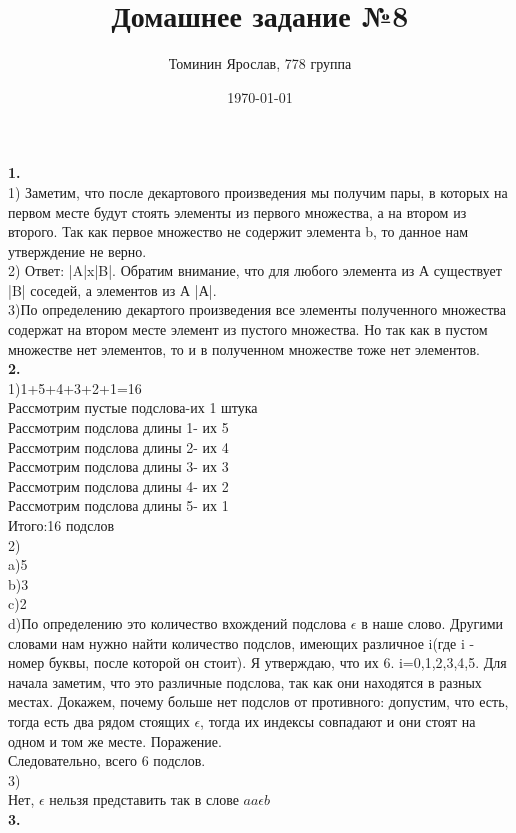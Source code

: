 \documentclass[a4paper,12pt]{article}
\author{Томинин Ярослав, 778 группа}
\title{Домашнее задание №8}
\date{\today}
\begin{document}
 

\maketitle
\newpage
\textbf{1.}\\
1) Заметим, что после декартового произведения мы получим пары, в которых на первом месте будут стоять элементы из первого множества, а на втором из второго. Так как первое множество не содержит элемента b, то данное нам утверждение не верно.\\
2) Ответ: |A|x|B|. Обратим внимание, что для любого элемента из А существует |B| соседей, а элементов из А |А|.\\
3)По определению декартого произведения все элементы полученного множества содержат на втором месте элемент из пустого множества. Но так как в пустом множестве нет элементов, то и в полученном множестве тоже нет элементов.\\
\textbf{2.}\\
1)1+5+4+3+2+1=16\\
Рассмотрим пустые подслова-их 1 штука\\
Рассмотрим подслова длины 1- их 5\\
Рассмотрим подслова длины 2- их 4\\
Рассмотрим подслова длины 3- их 3\\
Рассмотрим подслова длины 4- их 2\\
Рассмотрим подслова длины 5- их 1\\
Итого:16 подслов\\
2)\\
a)5\\
b)3\\
c)2\\
d)По определению это количество вхождений подслова $\epsilon$ в наше слово. Другими словами нам нужно найти количество подслов, имеющих различное i(где i - номер буквы, после которой он стоит). Я утверждаю, что их 6. i=0,1,2,3,4,5. Для начала заметим, что это различные подслова, так как они находятся в разных местах. Докажем, почему больше нет подслов от противного: допустим, что есть, тогда есть два рядом стоящих $\epsilon$, тогда их индексы совпадают и они стоят на одном и том же месте. Поражение.\\
Следовательно, всего 6 подслов.\\
3)\\
Нет, $\epsilon$ нельзя представить так в слове $aa\epsilon b$\\
\textbf{3.}\\
\end{document}
